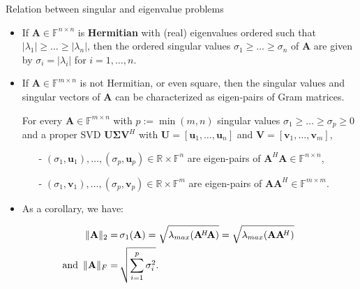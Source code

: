 \documentclass[t,usepdftitle=false]{beamer}
\begin{document}
\begin{frame}{Relation between singular and eigenvalue problems}
\begin{itemize}
\item If $\mathbf{A}\in\mathbb{F}^{n\times n}$ is \textbf{Hermitian} with (real) eigenvalues ordered such that $|\lambda_1|\geq\dots\geq|\lambda_n|$, then the ordered singular values $\sigma_1\geq\dots\geq\sigma_n$ of $\mathbf{A}$ are given by $\sigma_i=|\lambda_i|$ for $i=1,\dots,n$.
\item If  $\mathbf{A}\in\mathbb{F}^{m\times n}$ is not Hermitian, or even square, then the singular values and singular vectors of $\mathbf{A}$ can be characterized as eigen-pairs of Gram matrices. 
\begin{theorem}
For every $\mathbf{A}\in\mathbb{F}^{m\times n}$ with $p:=\min(m,n)$ singular values $\sigma_1\geq\dots\geq\sigma_p\geq 0$ 
and a proper SVD $\mathbf{U}\boldsymbol{\Sigma}\mathbf{V}^H$ with $\mathbf{U}=[\mathbf{u}_1,\dots,\mathbf{u}_n]$ and $\mathbf{V}=[\mathbf{v}_1,\dots,\mathbf{v}_m]$,
\vspace{-.1cm}
\begin{itemize}
\item[-] $(\sigma_1,\mathbf{u}_1),\dots,(\sigma_{p},\mathbf{u}_{p})\in\mathbb{R}\times\mathbb{F}^n$ are eigen-pairs of $\mathbf{A}^H\mathbf{A}\in\mathbb{F}^{n\times n}$,\vspace{-.1cm}
\item[-] $(\sigma_1,\mathbf{v}_1),\dots,(\sigma_{p},\mathbf{v}_{p})\in\mathbb{R}\times\mathbb{F}^m$ are eigen-pairs of $\mathbf{A}\mathbf{A}^H\in\mathbb{F}^{m\times m}$.
\end{itemize}
\end{theorem}
\vspace{.15cm}
\item 
\begin{minipage}[t]{.29\textwidth}
As a corollary, we have:
\end{minipage}
\begin{minipage}[t]{.5\textwidth}
\vspace{-.9cm}
\begin{align*}
\hspace{-.8cm}\|\mathbf{A}\|_2=&\,\sigma_1(\mathbf{A})=\sqrt{\lambda_{max}(\mathbf{A}^{\!H}\!\mathbf{A})}=\sqrt{\lambda_{max}(\mathbf{A}\mathbf{A}^{\!H})}\\
\hspace{-.8cm}\text{and }\,\|\mathbf{A}\|_F=&\,\sqrt{\sum_{i=1}^{p}\sigma_i^2}.
\end{align*}
\end{minipage}
\end{itemize}
\end{frame}
\end{document}

